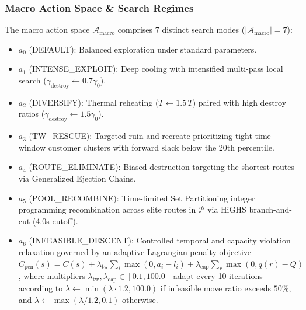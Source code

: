 \documentclass{ieeeaccess}
\begin{document}
\subsubsection{Macro Action Space \& Search Regimes}
The macro action space $\mathcal{A}_{\text{macro}}$ comprises 7 distinct search modes ($|\mathcal{A}_{\text{macro}}| = 7$):
\begin{itemize}
    \item $a_0$ (\textsf{\small DEFAULT}): Balanced exploration under standard parameters.
    \item $a_1$ (\textsf{\small INTENSE\_EXPLOIT}): Deep cooling with intensified multi-pass local search ($\gamma_{\text{destroy}} \leftarrow 0.7\gamma_0$).
    \item $a_2$ (\textsf{\small DIVERSIFY}): Thermal reheating ($T \leftarrow 1.5\,T$) paired with high destroy ratios ($\gamma_{\text{destroy}} \leftarrow 1.5\gamma_0$).
    \item $a_3$ (\textsf{\small TW\_RESCUE}): Targeted ruin-and-recreate prioritizing tight time-window customer clusters with forward slack below the 20th percentile.
    \item $a_4$ (\textsf{\small ROUTE\_ELIMINATE}): Biased destruction targeting the shortest routes via Generalized Ejection Chains.
    \item $a_5$ (\textsf{\small POOL\_RECOMBINE}): Time-limited Set Partitioning integer programming recombination across elite routes in $\mathcal{P}$ via HiGHS branch-and-cut (4.0s cutoff).
    \item $a_6$ (\textsf{\small INFEASIBLE\_DESCENT}): Controlled temporal and capacity violation relaxation governed by an adaptive Lagrangian penalty objective $C_{\text{pen}}(s) = C(s) + \lambda_{\text{tw}} \sum_{i} \max(0, a_i - l_i) + \lambda_{\text{cap}} \sum_{r} \max(0, q(r) - Q)$, where multipliers $\lambda_{\text{tw}}, \lambda_{\text{cap}} \in [0.1, 100.0]$ adapt every 10 iterations according to $\lambda \leftarrow \min(\lambda \cdot 1.2, 100.0)$ if infeasible move ratio exceeds $50\%$, and $\lambda \leftarrow \max(\lambda / 1.2, 0.1)$ otherwise.
\end{itemize}
\end{document}
